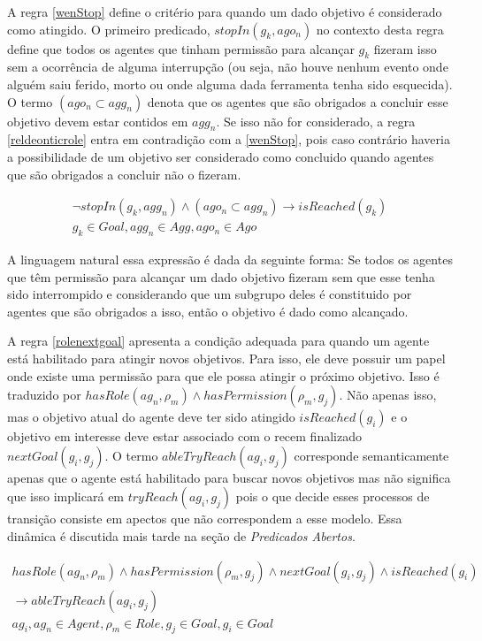 A regra \ref{wenStop} define o critério para quando um dado objetivo é considerado como atingido. O primeiro predicado, $stopIn(g_k,ago_n)$ no contexto
desta regra define que todos os agentes que tinham permissão para alcançar $g_k$ fizeram isso sem a ocorrência de alguma interrupção (ou seja, 
não houve nenhum evento onde alguém saiu ferido, morto ou onde alguma dada ferramenta tenha sido esquecida). O termo $(ago_n \subset agg_n)$ denota 
que os agentes que são obrigados a concluir esse objetivo devem estar contidos em $agg_n$. Se isso não for considerado, a regra \ref{reldeonticrole} entra 
em contradição com a \ref{wenStop}, pois caso contrário haveria a possibilidade de um objetivo ser considerado como concluido quando agentes que são 
obrigados a concluir não o fizeram. 

\begin{eqnarray}\label{wenStop}
	\neg stopIn(g_k,agg_n) \wedge (ago_n \subset agg_n) \to isReached(g_k) \nonumber \\ 
    g_k \in Goal, agg_n \in Agg, ago_n \in Ago 
\end{eqnarray}

A linguagem natural essa expressão é dada da seguinte forma: Se todos os agentes que têm permissão para alcançar um dado objetivo fizeram sem que 
esse tenha sido interrompido e considerando que um subgrupo deles é constituido por agentes que são obrigados a isso, então o objetivo é dado
como alcançado.

A regra \ref{rolenextgoal} apresenta a condição adequada para quando um agente está habilitado para atingir novos objetivos. Para isso, ele deve possuir
um papel onde existe uma permissão para que ele possa atingir o próximo objetivo. Isso é traduzido por $ hasRole(ag_n,\rho_m) \wedge hasPermission(\rho_m,g_j) $.
Não apenas isso, mas o objetivo atual do agente deve ter sido atingido $ isReached(g_i) $ e o objetivo em interesse deve estar associado com o recem 
finalizado $nextGoal(g_i,g_j)$. O termo $ableTryReach(ag_i,g_j)$ corresponde semanticamente apenas que o agente está habilitado para buscar novos 
objetivos mas não significa que isso implicará em $tryReach(ag_i,g_j)$ pois o que decide esses processos de transição consiste em apectos que não 
correspondem a esse modelo. Essa dinâmica é discutida mais tarde na seção de \textit{Predicados Abertos}.

\begin{eqnarray}\label{rolenextgoal}
	hasRole(ag_n,\rho_m) \wedge hasPermission(\rho_m,g_j) \wedge nextGoal(g_i,g_j) \wedge isReached(g_i) \nonumber \\
	\to ableTryReach(ag_i,g_j) \nonumber \\
    ag_i, ag_n \in Agent, \rho_m \in Role, g_j \in Goal, g_i \in Goal
\end{eqnarray}


